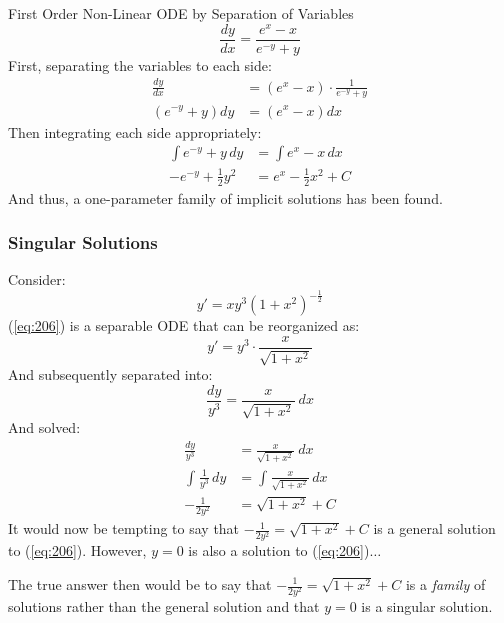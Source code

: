 \documentclass[12pt]{article}
\begin{document}
\begin{example}{First Order Non-Linear ODE by Separation of Variables}
  \begin{equation*}
    \frac{dy}{dx} = \frac{e^x - x}{e^{-y} + y}
  \end{equation*}
  First, separating the variables to each side:
  \begin{align*}
    \frac{dy}{dx} &= \left(e^x - x\right) \cdot \frac{1}{e^{-y} + y} \\
    \left(e^{-y} + y\right) dy &= \left(e^x - x\right) dx
  \end{align*}
  Then integrating each side appropriately:
  \begin{align*}
    \int e^{-y} + y \, dy &= \int e^x - x \, dx \\
    -e^{-y} + \frac{1}{2}y^2 &= e^x - \frac{1}{2}x^2 + C
  \end{align*}
  And thus, a one-parameter family of implicit solutions has been found.
\end{example}

\subsubsection{Singular Solutions}
\label{sssec:singularSolutions}

Consider:
\begin{equation}
  y' = xy^3\left(1+x^2\right)^{-\frac{1}{2}}
  \label{eq:206}
\end{equation}
(\ref{eq:206}) is a separable ODE that can be reorganized as:
\begin{equation*}
  y' = y^3 \cdot \frac{x}{\sqrt{1+x^2}}
\end{equation*}
And subsequently separated into:
\begin{equation*}
  \frac{dy}{y^3} = \frac{x}{\sqrt{1+x^2}}\ dx
\end{equation*}
And solved:
\begin{align*}
  \frac{dy}{y^3} &= \frac{x}{\sqrt{1+x^2}}\ dx \\
  \int_{}^{} \frac{1}{y^3} \, dy &= \int_{}^{} \frac{x}{\sqrt{1+x^2}}\,dx \\
  -\frac{1}{2y^2} &= \sqrt{1+x^2} + C
\end{align*}
It would now be tempting to say that $-\frac{1}{2y^2} = \sqrt{1+x^2} + C$ is a general solution to (\ref{eq:206}). However, $y=0$ is also a solution to (\ref{eq:206})$\hdots$

The true answer then would be to say that $-\frac{1}{2y^2} = \sqrt{1+x^2} + C$ is a \textit{family} of solutions rather than the general solution and that $y=0$ is a singular solution.
\end{document}
